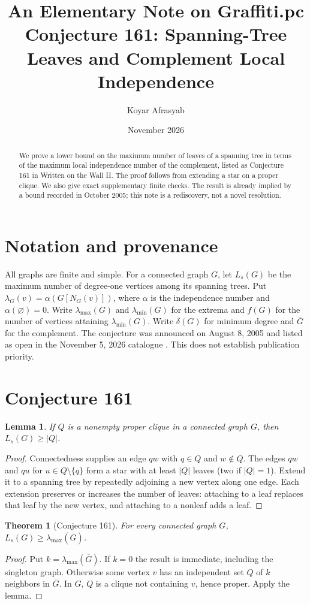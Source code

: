 \documentclass[11pt]{article}
\title{An Elementary Note on Graffiti.pc Conjecture 161: Spanning-Tree Leaves and Complement Local Independence}
\author{Koyar Afrasyab}
\date{November 2026}
\newtheorem{theorem}{Theorem}
\newtheorem{lemma}{Lemma}
\begin{document}
\maketitle
\begin{abstract}
We prove a lower bound on the maximum number of leaves of a spanning tree in terms of the maximum local independence number of the complement, listed as Conjecture 161 in Written on the Wall II. The proof follows from extending a star on a proper clique. We also give exact supplementary finite checks. The result is already implied by a bound recorded in October 2005; this note is a rediscovery, not a novel resolution.
\end{abstract}
\section{Notation and provenance}
All graphs are finite and simple. For a connected graph $G$, let $L_s(G)$ be the maximum number of degree-one vertices among its spanning trees. Put $\lambda_G(v)=\alpha(G[N_G(v)])$, where $\alpha$ is the independence number and $\alpha(\varnothing)=0$. Write $\lambda_{\max}(G)$ and $\lambda_{\min}(G)$ for the extrema and $f(G)$ for the number of vertices attaining $\lambda_{\min}(G)$. Write $\delta(G)$ for minimum degree and $\overline G$ for the complement. The conjecture was announced on August 8, 2005 and listed as open in the November 5, 2026 catalogue \cite{wow}. This does not establish publication priority.
\section{Conjecture 161}
\begin{lemma}
If $Q$ is a nonempty proper clique in a connected graph $G$, then $L_s(G)\ge |Q|$.
\end{lemma}
\begin{proof}
Connectedness supplies an edge $qw$ with $q\in Q$ and $w\notin Q$. The edges $qw$ and $qu$ for $u\in Q\setminus\{q\}$ form a star with at least $|Q|$ leaves (two if $|Q|=1$). Extend it to a spanning tree by repeatedly adjoining a new vertex along one edge. Each extension preserves or increases the number of leaves: attaching to a leaf replaces that leaf by the new vertex, and attaching to a nonleaf adds a leaf.
\end{proof}
\begin{theorem}[Conjecture 161]
For every connected graph $G$, $L_s(G)\ge\lambda_{\max}(\overline G)$.
\end{theorem}
\begin{proof}
Put $k=\lambda_{\max}(\overline G)$. If $k=0$ the result is immediate, including the singleton graph. Otherwise some vertex $v$ has an independent set $Q$ of $k$ neighbors in $\overline G$. In $G$, $Q$ is a clique not containing $v$, hence proper. Apply the lemma.
\end{proof}
\end{document}

